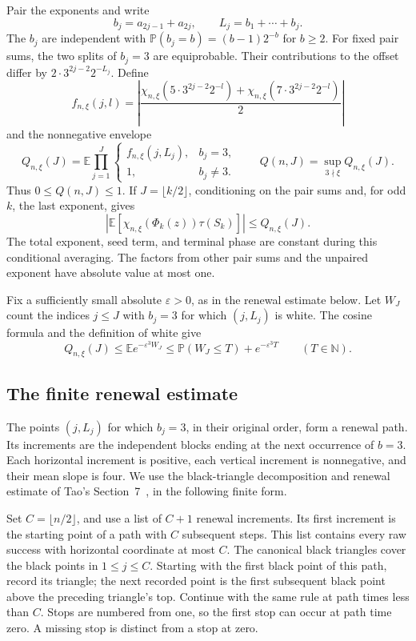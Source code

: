 \documentclass[11pt,a4paper]{article}
\newcommand{\N}{\mathbb N}
\newcommand{\E}{\mathbb E}
\newcommand{\PP}{\mathbb P}
\newcommand{\eps}{\varepsilon}
\newcommand{\abs}[1]{\left|#1\right|}
\begin{document}
Pair the exponents and write
\[
 b_j=a_{2j-1}+a_{2j},\qquad L_j=b_1+\cdots+b_j.
\]
The \(b_j\) are independent with
\(\PP(b_j=b)=(b-1)2^{-b}\) for \(b\ge2\). For fixed pair sums,
the two splits of \(b_j=3\) are equiprobable. Their contributions to
the offset differ by
\(2\cdot3^{2j-2}2^{-L_j}\). Define
\[
 f_{n,\xi}(j,l)=
 \left|\frac{\chi_{n,\xi}(5\cdot3^{2j-2}2^{-l})+
                   \chi_{n,\xi}(7\cdot3^{2j-2}2^{-l})}{2}\right|
\]
and the nonnegative envelope
\begin{equation}\label{eq:envelope}
 Q_{n,\xi}(J)=\E\prod_{j=1}^J
 \begin{cases}f_{n,\xi}(j,L_j),&b_j=3,\\1,&b_j\ne3.\end{cases}
 \qquad
 Q(n,J)=\sup_{3\nmid\xi}Q_{n,\xi}(J).
\end{equation}
Thus \(0\le Q(n,J)\le1\). If \(J=\lfloor k/2\rfloor\),
conditioning on the pair sums and, for odd \(k\), the last exponent,
gives
\begin{equation}\label{eq:pair-majorant}
 \abs{\E[\chi_{n,\xi}(\Phi_k(z))\tau(S_k)]}
 \le Q_{n,\xi}(J).
\end{equation}
The total exponent, seed term, and terminal phase are constant during
this conditional averaging. The factors from other pair sums and the
unpaired exponent have absolute value at most one.

Fix a sufficiently small absolute \(\eps>0\), as in the renewal
estimate below. Let \(W_J\) count the indices \(j\le J\) with
\(b_j=3\) for which \((j,L_j)\) is white. The cosine formula and
the definition of white give
\begin{equation}\label{eq:laplace}
 Q_{n,\xi}(J)\le\E e^{-\eps^3W_J}
 \le\PP(W_J\le T)+e^{-\eps^3T}\qquad(T\in\N).
\end{equation}

\subsection{The finite renewal estimate}

The points \((j,L_j)\) for which \(b_j=3\), in their original order,
form a renewal path. Its increments are the independent blocks ending
at the next occurrence of \(b=3\). Each horizontal increment is
positive, each vertical increment is nonnegative, and their mean
slope is four. We use the black-triangle decomposition and renewal
estimate of Tao's Section~7~\cite{Tao}, in the following finite form.

Set \(C=\lfloor n/2\rfloor\), and use a list of \(C+1\) renewal
increments. Its first increment is the starting point of a path with
\(C\) subsequent steps. This list contains every raw success with
horizontal coordinate at most \(C\). The canonical black triangles
cover the black points in \(1\le j\le C\). Starting with the first
black point of this path, record its triangle; the next recorded point
is the first subsequent black point above the preceding triangle's
top. Continue with the same rule at path times less than \(C\).
Stops are numbered from one, so
the first stop can occur at path time zero. A missing stop is distinct
from a stop at zero.
\end{document}
